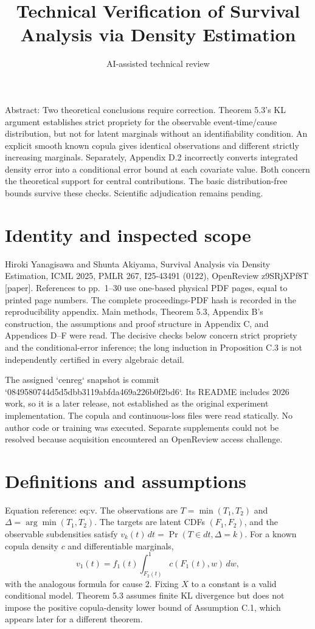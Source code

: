 \documentclass[10pt]{article}
\title{Technical Verification of
Survival Analysis via Density Estimation}
\author{AI-assisted technical review}
\date{}
\begin{document}
\maketitle
Abstract: Two theoretical conclusions require correction. Theorem 5.3’s KL argument establishes strict propriety for the observable event-time/cause distribution, but not for latent marginals without an identifiability condition. An explicit smooth known copula gives identical observations and different strictly increasing marginals. Separately, Appendix D.2 incorrectly converts integrated density error into a conditional error bound at each covariate value. Both concern the theoretical support for central contributions. The basic distribution-free bounds survive these checks. Scientific adjudication remains pending.\par
\section*{Identity and inspected scope}
Hiroki Yanagisawa and Shunta Akiyama, Survival Analysis via Density Estimation, ICML 2025, PMLR 267, I25-43491 (0122), OpenReview z9SRjXPf8T [paper]. References to pp. 1–30 use one-based physical PDF pages, equal to printed page numbers. The complete proceedings-PDF hash is recorded in the reproducibility appendix. Main methods, Theorem 5.3, Appendix B’s construction, the assumptions and proof structure in Appendix C, and Appendices D–F were read. The decisive checks below concern strict propriety and the conditional-error inference; the long induction in Proposition C.3 is not independently certified in every algebraic detail.\par
The assigned `cenreg` snapshot is commit `0849580744d5d5dbb3119abfda469a226b0f2bd6`. Its README includes 2026 work, so it is a later release, not established as the original experiment implementation. The copula and continuous-loss files were read statically. No author code or training was executed. Separate supplements could not be resolved because acquisition encountered an OpenReview access challenge.\par
\section*{Definitions and assumptions}
Equation reference: eq:v. The observations are \(T=\min(T_1,T_2)\) and \(\Delta=\arg\min(T_1,T_2)\). The targets are latent CDFs \((F_1,F_2)\), and the observable subdensities satisfy \(v_k(t)\,dt=\Pr(T\in dt,\Delta=k)\). For a known copula density \(c\) and differentiable marginals, \[
 v_1(t)=f_1(t)\int_{F_2(t)}^1c(F_1(t),w)\,dw,\] with the analogous formula for cause 2. Fixing \(X\) to a constant is a valid conditional model. Theorem 5.3 assumes finite KL divergence but does not impose the positive copula-density lower bound of Assumption C.1, which appears later for a different theorem.\par
\end{document}
